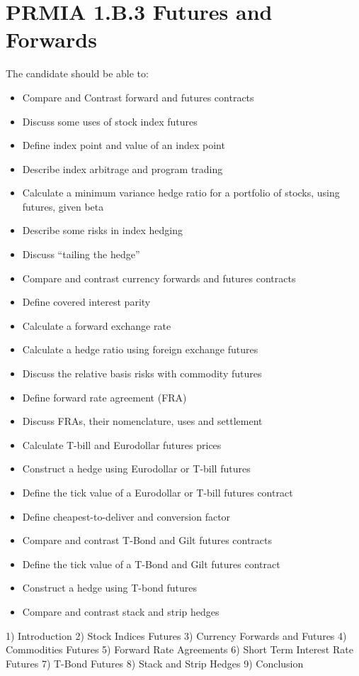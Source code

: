 \section{PRMIA 1.B.3 Futures and Forwards }
The candidate should be able to:
\begin{itemize}
 \item	Compare and Contrast forward and futures contracts
\item	 Discuss some uses of stock index futures
\item	 Define index point and value of an index point
\item	 Describe index arbitrage and program trading
\item	 Calculate a minimum variance hedge ratio for a portfolio of stocks, using futures, given beta
\item	 Describe some risks in index hedging
\item	 Discuss “tailing the hedge”
\item	 Compare and contrast currency forwards and futures contracts
\item	 Define covered interest parity
\item	 Calculate a forward exchange rate
\item	 Calculate a hedge ratio using foreign exchange futures
\item	 Discuss the relative basis risks with commodity futures
\item	 Define forward rate agreement (FRA)
\item	 Discuss FRAs, their nomenclature, uses and settlement
\item	 Calculate T-bill and Eurodollar futures prices
\item	 Construct a hedge using Eurodollar or T-bill futures
\item	 Define the tick value of a Eurodollar or T-bill futures contract
\item	 Define cheapest-to-deliver and conversion factor
\item	 Compare and contrast T-Bond and Gilt futures contracts
\item	 Define the tick value of a T-Bond and Gilt futures contract
\item	 Construct a hedge using T-bond futures
\item	 Compare and contrast stack and strip hedges
\end{itemize}



1) Introduction
2) Stock Indices Futures
3) Currency Forwards and Futures
4) Commodities Futures 
5) Forward Rate Agreements
6) Short Term Interest Rate Futures
7) T-Bond Futures  
8) Stack and Strip Hedges
9) Conclusion


